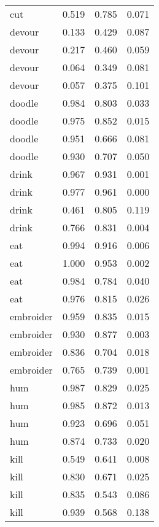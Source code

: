 \begin{longtable}{l|rrr}
cut       & 0.519  & 0.785     & 0.071         \\
devour    & 0.133  & 0.429     & 0.087         \\
devour    & 0.217  & 0.460      & 0.059         \\
devour    & 0.064  & 0.349     & 0.081         \\
devour    & 0.057  & 0.375     & 0.101         \\
doodle    & 0.984  & 0.803     & 0.033         \\
doodle    & 0.975  & 0.852     & 0.015         \\
doodle    & 0.951  & 0.666     & 0.081         \\
doodle    & 0.930   & 0.707     & 0.050          \\
drink     & 0.967  & 0.931     & 0.001         \\
drink     & 0.977  & 0.961     & 0.000             \\
drink     & 0.461  & 0.805     & 0.119         \\
drink     & 0.766  & 0.831     & 0.004         \\
eat       & 0.994  & 0.916     & 0.006         \\
eat       & 1.000      & 0.953     & 0.002         \\
eat       & 0.984  & 0.784     & 0.040          \\
eat       & 0.976  & 0.815     & 0.026         \\
embroider & 0.959  & 0.835     & 0.015         \\
embroider & 0.930   & 0.877     & 0.003         \\
embroider & 0.836  & 0.704     & 0.018         \\
embroider & 0.765  & 0.739     & 0.001         \\
hum       & 0.987  & 0.829     & 0.025         \\
hum       & 0.985  & 0.872     & 0.013         \\
hum       & 0.923  & 0.696     & 0.051         \\
hum       & 0.874  & 0.733     & 0.020          \\
kill      & 0.549  & 0.641     & 0.008         \\
kill      & 0.830   & 0.671     & 0.025         \\
kill      & 0.835  & 0.543     & 0.086         \\
kill      & 0.939  & 0.568     & 0.138         \\

\end{longtable}
